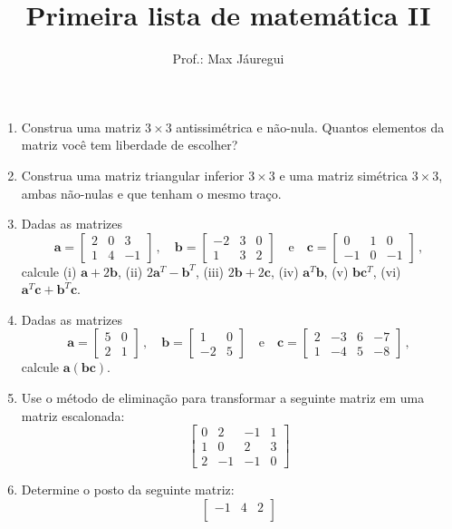 \documentclass[12pt,a4paper]{article}
\title{Primeira lista de matemática II}
\author{Prof.: Max Jáuregui}
\date{}
\newcommand{\mb}{\mathbf}
\begin{document}
\maketitle
\begin{enumerate}
  \item Construa uma matriz $3\times 3$ antissimétrica e não-nula. Quantos elementos da matriz você tem liberdade de escolher?
  \item Construa uma matriz triangular inferior $3\times 3$ e uma matriz simétrica $3\times 3$, ambas não-nulas e que tenham o mesmo traço.
  \item Dadas as matrizes
  $$\mb a=\begin{bmatrix}
    2&0&3\\
    1&4&-1
  \end{bmatrix}\,,\quad \mb b=\begin{bmatrix}
    -2&3&0\\
    1&3&2
  \end{bmatrix}\quad\text{e}\quad \mb c=\begin{bmatrix}
    0&1&0\\
    -1&0&-1
  \end{bmatrix}\,,$$
  calcule (i) $\mb a+2\mb b$, (ii) $2\mb a^T-\mb b^T$, (iii) $2\mb b+2\mb c$, (iv) $\mb a^T\mb b$, (v) $\mb b\mb c^T$, (vi) $\mb a^T\mb c+\mb b^T\mb c$.
  \item Dadas as matrizes
  $$\mb a=\begin{bmatrix}
    5&0\\
    2&1
  \end{bmatrix}\,,\quad \mb b=\begin{bmatrix}
    1&0\\
    -2&5
  \end{bmatrix}\quad\text{e}\quad \mb c=\begin{bmatrix}
    2&-3&6&-7\\
    1&-4&5&-8
  \end{bmatrix}\,,$$
  calcule $\mb a(\mb{bc})$.
  \item Use o método de eliminação para transformar a seguinte matriz em uma matriz escalonada:
  $$\begin{bmatrix}
    0&2&-1&1\\
    1&0&2&3\\
    2&-1&-1&0
  \end{bmatrix}$$
  \item Determine o posto da seguinte matriz:
  $$\begin{bmatrix}
    -1&4&2\\

\end{bmatrix}$$
\end{enumerate}
\end{document}
